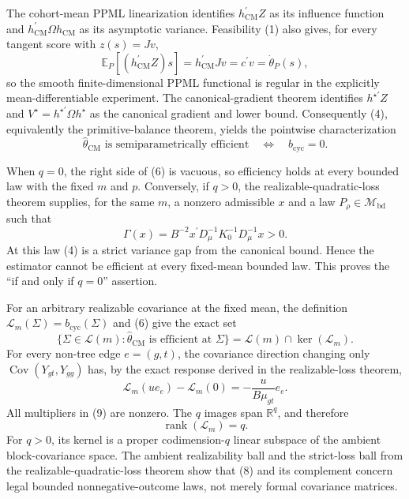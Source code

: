 The cohort-mean PPML linearization identifies
\(h_{\mathrm{CM}}^{\prime}Z\) as its influence function and
\(h_{\mathrm{CM}}^{\prime}\Omega h_{\mathrm{CM}}\) as its asymptotic variance.  Feasibility (1) also gives, for every tangent score with \(z(s)=Jv\),
\[
\mathbb E_P[(h_{\mathrm{CM}}^{\prime}Z)s]
=h_{\mathrm{CM}}^{\prime}Jv=c^{\prime}v=\dot\theta_P(s),               \tag{5}
\]
so the smooth finite-dimensional PPML functional is regular in the explicitly mean-differentiable experiment.  The canonical-gradient theorem identifies \(h^{\star\prime}Z\) and
\(V^{\star}=h^{\star\prime}\Omega h^{\star}\) as the canonical gradient and lower bound.  Consequently (4), equivalently the primitive-balance theorem, yields the pointwise characterization
\[
\widehat\theta_{\mathrm{CM}}\text{ is semiparametrically efficient}
\quad\Longleftrightarrow\quad
b_{\mathrm{cyc}}=0.                                                     \tag{6}
\]

When \(q=0\), the right side of (6) is vacuous, so efficiency holds at every bounded law with the fixed \(m\) and \(p\).  Conversely, if \(q>0\), the realizable-quadratic-loss theorem supplies, for the same \(m\), a nonzero admissible \(x\) and a law \(P_\rho\in\mathcal M_{\mathrm{bd}}\) such that
\[
\Gamma(x)
=B^{-2}x^{\prime}D_\mu^{-1}K_0^{-1}D_\mu^{-1}x>0.                    \tag{7}
\]
At this law (4) is a strict variance gap from the canonical bound.  Hence the estimator cannot be efficient at every fixed-mean bounded law.  This proves the ``if and only if \(q=0\)'' assertion.

For an arbitrary realizable covariance at the fixed mean, the definition
\(\mathcal L_m(\Sigma)=b_{\mathrm{cyc}}(\Sigma)\) and (6) give the exact set
\[
\{\Sigma\in\mathcal L(m):
  \widehat\theta_{\mathrm{CM}}\text{ is efficient at }\Sigma\}
=\mathcal L(m)\cap\ker(\mathcal L_m).                                  \tag{8}
\]
For every non-tree edge \(e=(g,t)\), the covariance direction changing only
\(\operatorname{Cov}(Y_{gt},Y_{gg})\) has, by the exact response derived in the realizable-loss theorem,
\[
\mathcal L_m(ue_e)-\mathcal L_m(0)
=-\frac{u}{B\mu_{gt}}e_e.                                               \tag{9}
\]
All multipliers in (9) are nonzero.  The \(q\) images span \(\mathbb R^q\), and therefore
\[
\operatorname{rank}(\mathcal L_m)=q.                                   \tag{10}
\]
For \(q>0\), its kernel is a proper codimension-\(q\) linear subspace of the ambient block-covariance space.  The ambient realizability ball and the strict-loss ball from the realizable-quadratic-loss theorem show that (8) and its complement concern legal bounded nonnegative-outcome laws, not merely formal covariance matrices.

